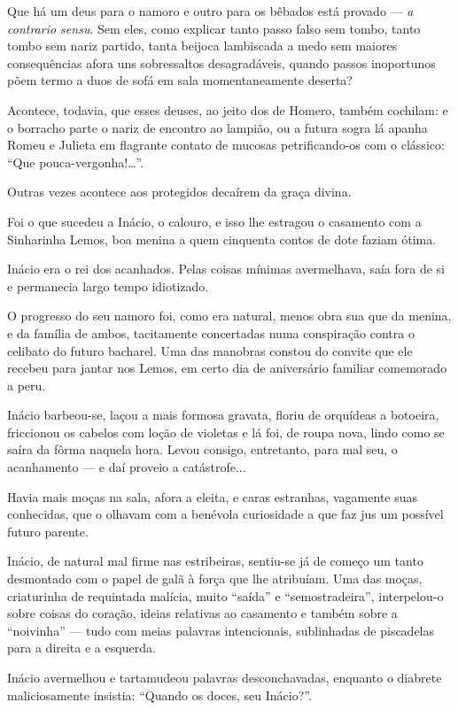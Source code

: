 Que há um deus para o namoro e outro para os bêbados está provado ---
\emph{a contrario sensu}. Sem eles, como explicar tanto passo falso sem
tombo, tanto tombo sem nariz partido, tanta beijoca lambiscada a medo
sem maiores consequências afora uns sobressaltos desagradáveis, quando
passos inoportunos põem termo a duos de sofá em sala momentaneamente
deserta?

Acontece, todavia, que esses deuses, ao jeito dos de Homero, também
cochilam: e o borracho parte o nariz de encontro ao lampião, ou a futura
sogra lá apanha Romeu e Julieta em flagrante contato de mucosas
petrificando-os com o clássico: ``Que pouca-vergonha!\ldots{}''.

Outras vezes acontece aos protegidos decaírem da graça divina.

Foi o que sucedeu a Inácio, o calouro, e isso lhe estragou o casamento
com a Sinharinha Lemos, boa menina a quem cinquenta contos de dote
faziam ótima.

Inácio era o rei dos acanhados. Pelas coisas mínimas avermelhava, saía
fora de si e permanecia largo tempo idiotizado.

O progresso do seu namoro foi, como era natural, menos obra sua que da
menina, e da família de ambos, tacitamente concertadas numa conspiração
contra o celibato do futuro bacharel. Uma das manobras constou do
convite que ele recebeu para jantar nos Lemos, em certo dia de
aniversário familiar comemorado a peru.

Inácio barbeou-se, laçou a mais formosa gravata, floriu de orquídeas a
botoeira, friccionou os cabelos com loção de violetas e lá foi, de roupa
nova, lindo como se saíra da fôrma naquela hora. Levou consigo,
entretanto, para mal seu, o acanhamento --- e daí proveio a
catástrofe...

Havia mais moças na sala, afora a eleita, e caras estranhas, vagamente
suas conhecidas, que o olhavam com a benévola curiosidade a que faz jus
um possível futuro parente.

Inácio, de natural mal firme nas estribeiras, sentiu-se já de começo um
tanto desmontado com o papel de galã à força que lhe atribuíam. Uma das
moças, criaturinha de requintada malícia, muito ``saída'' e
``semostradeira'', interpelou-o sobre coisas do coração, ideias
relativas ao casamento e também sobre a ``noivinha'' --- tudo com meias
palavras intencionais, sublinhadas de piscadelas para a direita e a
esquerda.

Inácio avermelhou e tartamudeou palavras desconchavadas, enquanto o
diabrete maliciosamente insistia: ``Quando os doces, seu Inácio?''.

